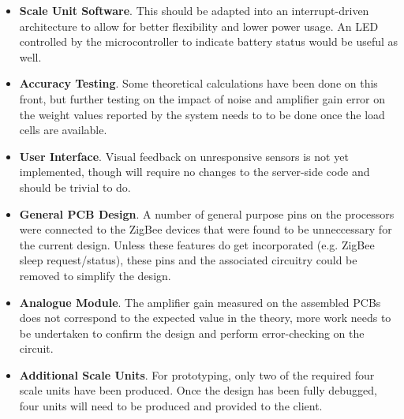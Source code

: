 \begin{itemize}
	\item \textbf{Scale Unit Software}. This should be adapted into an interrupt-driven architecture to allow for better flexibility and lower power usage. An LED controlled by the microcontroller to indicate battery status would be useful as well.
	\item \textbf{Accuracy Testing}. Some theoretical calculations have been done on this front, but further testing on the impact of noise and amplifier gain error on the weight values reported by the system needs to to be done once the load cells are available.
	\item \textbf{User Interface}. Visual feedback on unresponsive sensors is not yet implemented, though will require no changes to the server-side code and should be trivial to do. %
	\item \textbf{General PCB Design}. A number of general purpose pins on the processors were connected to the ZigBee devices that were found to be unneccessary for the current design. Unless these features do get incorporated (e.g. ZigBee sleep request/status), these pins and the associated circuitry could be removed to simplify the design.
	\item \textbf{Analogue Module}. The amplifier gain measured on the assembled PCBs does not correspond to the expected value in the theory, more work needs to be undertaken to confirm the design and perform error-checking on the circuit.
	\item \textbf{Additional Scale Units}. For prototyping, only two of the required four scale units have been produced. Once the design has been fully debugged, four units will need to be produced and provided to the client.
\end{itemize}
